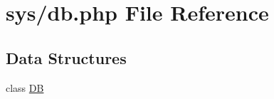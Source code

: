 \hypertarget{db_8php}{}\section{sys/db.php File Reference}
\label{db_8php}
\subsection*{Data Structures}
\begin{DoxyCompactItemize}
\item 
class \hyperlink{classDB}{D\+B}
\end{DoxyCompactItemize}
